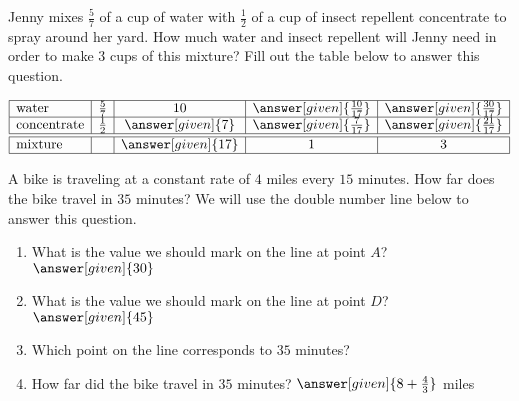 \documentclass[nooutcomes]{ximera}
\begin{document}
\begin{problem}
Jenny mixes $\frac{5}{7}$ of a cup of water with $\frac{1}{2}$ of a cup of insect repellent concentrate to spray around her yard.  How much water and insect repellent will Jenny need in order to make $3$ cups of this mixture?  Fill out the table below to answer this question.

\[
\begin{array}{|l|c|c|c|c|} \hline
\textrm{water} & \frac{5}{7} & 10 & \answer[given]{\frac{10}{17}} & \answer[given]{\frac{30}{17}} \\ \hline
\textrm{concentrate}& \frac{1}{2} & \answer[given]{7} & \answer[given]{\frac{7}{17}} & \answer[given]{\frac{21}{17}} \\ \hline \hline
\textrm{mixture} & & \answer[given]{17} & 1 & 3 \\ \hline
\end{array}
\]

\end{problem}




\begin{problem}
A bike is traveling at a constant rate of $4$ miles every $15$ minutes.  How far does the bike travel in $35$ minutes?  We will use the double number line below to answer this question.

\begin{center}
\end{center}
\begin{enumerate}
	\item What is the value we should mark on the line at point $A$? $\answer[given]{30}$
	\item What is the value we should mark on the line at point $D$? $\answer[given]{45}$
	\item Which point on the line corresponds to $35$ minutes?
		 \begin{multipleChoice}
		 \end{multipleChoice}
	\item How far did the bike travel in $35$ minutes? $\answer[given]{8+\frac{4}{3}}$ miles
\end{enumerate}

\end{problem}
\end{document}
